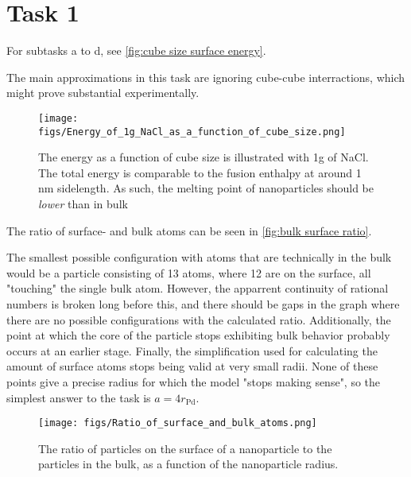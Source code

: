 







\section{Task 1}

    For subtasks a to d, see \autoref{fig:cube size surface energy}.

    The main approximations in this task are ignoring cube-cube interractions, 
    which might prove substantial experimentally.

    \begin{figure}[bh]
        \texttt{[image: figs/Energy\_of\_1g\_NaCl\_as\_a\_function\_of\_cube\_size.png]}

        \caption{The energy as a function of cube size is 
        illustrated with 1g of NaCl. 
        The total energy is comparable to the fusion enthalpy at 
        around 1 nm sidelength. 
        As such, the melting point of nanoparticles should be 
        \textit{lower} than in bulk}
        \label{fig:cube size surface energy}
    \end{figure}

    The ratio of surface- and bulk atoms can be seen in \autoref{fig:bulk surface ratio}.

    The smallest possible configuration with atoms that are technically in the bulk
    would be a particle consisting of 13 atoms, where 12 are on the surface, 
    all "touching" the single bulk atom. 
    However, the apparrent continuity of rational numbers is 
    broken long before this, and there should be gaps in the graph
    where there are no possible configurations with the calculated ratio.
    Additionally, the point at which the core of the particle stops
    exhibiting bulk behavior probably occurs at an earlier stage. 
    Finally, the simplification used for calculating the amount of
    surface atoms stops being valid at very small radii. 
    None of these points give a precise radius for which the model
    "stops making sense", so the simplest answer to the task is $a = 4r_{\text{Pd}}$.

    \begin{figure}[h]
        \texttt{[image: figs/Ratio\_of\_surface\_and\_bulk\_atoms.png]}

        \caption{The ratio of particles on the surface of a nanoparticle
        to the particles in the bulk, as a function of the nanoparticle radius.
        }
        \label{fig:bulk surface ratio}
    \end{figure}

